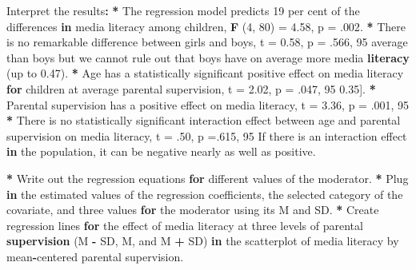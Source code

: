 \documentclass[a4paper]{book}
\newenvironment{Shaded}{\begin{snugshade}}{\end{snugshade}}
\newcommand{\KeywordTok}[1]{\textcolor[rgb]{0,0,0}{\textbf{#1}}}
\newcommand{\DecValTok}[1]{\textcolor[rgb]{0.00,0.00,0.00}{#1}}
\newcommand{\FloatTok}[1]{\textcolor[rgb]{0.00,0.00,0.00}{#1}}
\newcommand{\StringTok}[1]{\textcolor[rgb]{0.00,0.00,0.00}{#1}}
\newcommand{\ControlFlowTok}[1]{\textcolor[rgb]{0.00,0.00,0.00}{\textbf{#1}}}
\newcommand{\OperatorTok}[1]{\textcolor[rgb]{0.00,0.00,0.00}{\textbf{#1}}}
\newcommand{\ErrorTok}[1]{\textcolor[rgb]{0.00,0.00,0.00}{\textbf{#1}}}
\newcommand{\NormalTok}[1]{#1}
\theoremstyle{definition}
\theoremstyle{definition}
\theoremstyle{definition}
\theoremstyle{remark}
\begin{document}
\begin{Shaded}
\begin{Highlighting}[]
\NormalTok{Interpret the results}\OperatorTok{:}\StringTok{  }
\StringTok{    }
\ErrorTok{*}\StringTok{ }\NormalTok{The regression model predicts }\DecValTok{19}\NormalTok{ per cent of the differences }\ControlFlowTok{in}\NormalTok{ media}
\NormalTok{literacy among children, }\KeywordTok{F}\NormalTok{ (}\DecValTok{4}\NormalTok{, }\DecValTok{80}\NormalTok{) =}\StringTok{ }\FloatTok{4.58}\NormalTok{, p =}\StringTok{ }\NormalTok{.}\DecValTok{002}\NormalTok{.}
\OperatorTok{*}\StringTok{ }\NormalTok{There is no remarkable difference between girls and boys, t =}\StringTok{ }\FloatTok{0.58}\NormalTok{, p =}
\NormalTok{.}\DecValTok{566}\NormalTok{, }\DecValTok{95}\NormalTok{%
\NormalTok{average than boys but we cannot rule out that boys have on average more media}
\KeywordTok{literacy}\NormalTok{ (up to }\FloatTok{0.47}\NormalTok{).}
\OperatorTok{*}\StringTok{ }\NormalTok{Age has a statistically significant positive effect on media literacy }\ControlFlowTok{for}
\NormalTok{children at average parental supervision, t =}\StringTok{ }\FloatTok{2.02}\NormalTok{, p =}\StringTok{ }\NormalTok{.}\DecValTok{047}\NormalTok{, }\DecValTok{95}\NormalTok{%
\FloatTok{0.35}\NormalTok{].}
\OperatorTok{*}\StringTok{ }\NormalTok{Parental supervision has a positive effect on media literacy, t =}\StringTok{ }\FloatTok{3.36}\NormalTok{, p =}
\NormalTok{.}\DecValTok{001}\NormalTok{, }\DecValTok{95}\NormalTok{%
\OperatorTok{*}\StringTok{ }\NormalTok{There is no statistically significant interaction effect between age and}
\NormalTok{parental supervision on media literacy, t =}\StringTok{ }\NormalTok{.}\DecValTok{50}\NormalTok{, p =.}\DecValTok{615}\NormalTok{, }\DecValTok{95}\NormalTok{%
\NormalTok{If there is an interaction effect }\ControlFlowTok{in}\NormalTok{ the population, it can be negative nearly}
\NormalTok{as well as positive.}

\OperatorTok{*}\StringTok{ }\NormalTok{Write out the regression equations }\ControlFlowTok{for}\NormalTok{ different values of the moderator.}
\OperatorTok{*}\StringTok{ }\NormalTok{Plug }\ControlFlowTok{in}\NormalTok{ the estimated values of the regression coefficients, the selected}
\NormalTok{category of the covariate, and three values }\ControlFlowTok{for}\NormalTok{ the moderator using its M and}
\NormalTok{SD.}
\OperatorTok{*}\StringTok{ }\NormalTok{Create regression lines }\ControlFlowTok{for}\NormalTok{ the effect of media literacy at three levels of}
\NormalTok{parental }\KeywordTok{supervision}\NormalTok{ (M }\OperatorTok{-}\StringTok{ }\NormalTok{SD, M, and M }\OperatorTok{+}\StringTok{ }\NormalTok{SD) }\ControlFlowTok{in}\NormalTok{ the scatterplot of media}
\NormalTok{literacy by mean}\OperatorTok{-}\NormalTok{centered parental supervision.}
  
}}}}
\end{Highlighting}
\end{Shaded}
\end{document}
